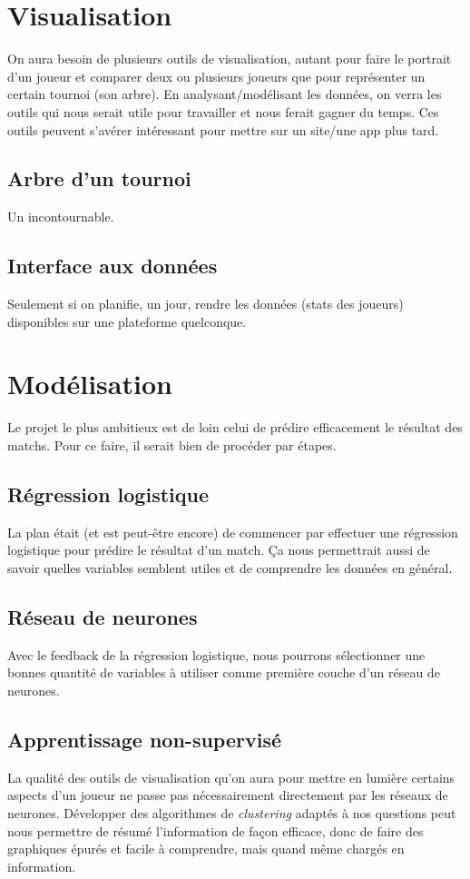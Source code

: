 \documentclass[12pt]{article}
\begin{document}
\newpage
\section{Visualisation}
On aura besoin de plusieurs outils de visualisation, autant pour faire le portrait d'un joueur et comparer deux ou plusieurs joueurs que pour représenter un certain tournoi (son arbre). En analysant/modélisant les données, on verra les outils qui nous serait utile pour travailler et nous ferait gagner du temps. Ces outils peuvent s'avérer intéressant pour mettre sur un site/une app plus tard.

\subsection{Arbre d'un tournoi}
Un incontournable.

\subsection{Interface aux données}
Seulement si on planifie, un jour, rendre les données (stats des joueurs) disponibles sur une plateforme quelconque.

\newpage
\section{Modélisation}

Le projet le plus ambitieux est de loin celui de prédire efficacement le résultat des matchs. Pour ce faire, il serait bien de procéder par étapes.

\subsection{Régression logistique}
La plan était (et est peut-être encore) de commencer par effectuer une régression logistique pour prédire le résultat d'un match. Ça nous permettrait aussi de savoir quelles variables semblent utiles et de comprendre les données en général.

\subsection{Réseau de neurones}
Avec le feedback de la régression logistique, nous pourrons sélectionner une bonnes quantité de variables à utiliser comme première couche d'un réseau de neurones.


\newpage
\subsection{Apprentissage non-supervisé}
La qualité des outils de visualisation qu'on aura pour mettre en lumière certains aspects d'un joueur ne passe pas nécessairement directement par les réseaux de neurones. Développer des algorithmes de \textit{clustering} adaptés à nos questions peut nous permettre de résumé l'information de façon efficace, donc de faire des graphiques épurés et facile à comprendre, mais quand même chargés en information.
\end{document}
